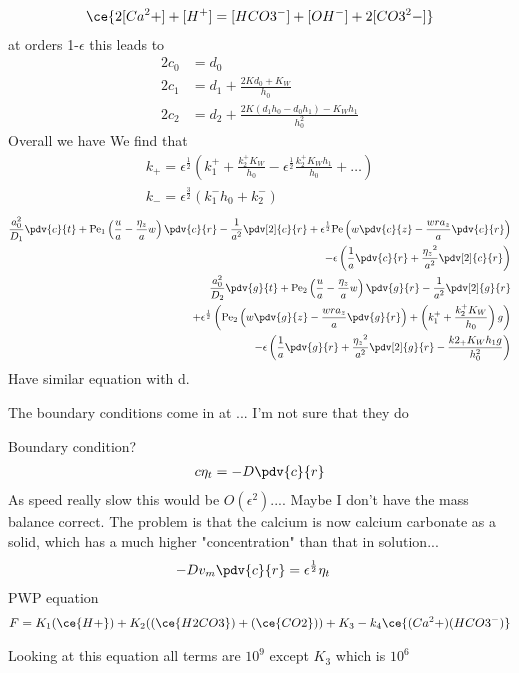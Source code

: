 \documentclass[12pt]{article}
\newcommand{\rt}{^{\frac{1}{2}}}
\newcommand{\rtt}{^{\frac{3}{2}}}
\newcommand{\Pe}{\mathrm{Pe}}
\begin{document}
\begin{align}
\ce{2[Ca^2+] + [H^+]=[HCO3^-] + [OH^-] + 2[CO3^2-]}
\end{align}
at orders 1-$\epsilon$ this leads to 
\begin{align}
2c_0 &= d_0\\
2c_1 & = d_1+\frac{2Kd_0+K_W}{h_0}\\
2c_2& = d_2+\frac{2K(d_1h_0-d_0h_1)-K_Wh_1}{h_0^2}
\end{align}
Overall we have 
We find that
\begin{align}
k_+ = \epsilon\rt\left(k_1^+ + \frac{k_2^+K_W}{h_0}-\epsilon\rt \frac{k_2^+K_Wh_1}{h_0}+\dots\right)\\
k_- = \epsilon\rtt\left(k_1^-h_0+k_2^-\right)
\end{align}
\begin{align}
\frac{a_0^2}{D_1}\pdv{c}{t}+\Pe_1\left(\frac{u}{a}-\frac{\eta_z}{a}w\right)\pdv{c}{r}-\frac{1}{a^2}\pdv[2]{c}{r}+\epsilon\rt\Pe\left(w\pdv{c}{z}-\frac{wra_z}{a}\pdv{c}{r}\right)\\-\epsilon\left(\frac{1}{a}\pdv{c}{r}+\frac{{\eta_z}^2}{a^2}\pdv[2]{c}{r}\right)\\
\frac{a_0^2}{D_2}\pdv{g}{t}+\Pe_2\left(\frac{u}{a}-\frac{\eta_z}{a}w\right)\pdv{g}{r}-\frac{1}{a^2}\pdv[2]{g}{r}\\
+\epsilon\rt\left(\Pe_2\left(w\pdv{g}{z}-\frac{wra_z}{a}\pdv{g}{r}\right)+\left(k_1^++\frac{k_2^+K_W}{h_0}\right)g\right)\\
-\epsilon\left(\frac{1}{a}\pdv{g}{r}+\frac{{\eta_z}^2}{a^2}\pdv[2]{g}{r}-\frac{k2_+K_Wh_1g}{h_0^2}\right)
\end{align}
Have similar equation with d.

The boundary conditions come in at ... I'm not sure that they do 

Boundary condition?
\begin{align}
c\eta_t = -D\pdv{c}{r}
\end{align}
As speed really slow this would be $O(\epsilon^2)$.... Maybe I don't have the mass balance correct. The problem is that the calcium is now calcium carbonate as a solid, which has a much higher "concentration" than that in solution...
\begin{align}
-Dv_m\pdv{c}{r} &= \epsilon\rt \eta_t
\end{align}
PWP equation
\begin{align}
F = K_1(\ce{H+})+K_2((\ce{H2CO3})+(\ce{CO2}))+K_3-k_4\ce{(Ca^2+)(HCO3^-)}
\end{align}

Looking at this equation all terms are $10^9$ except $K_3$ which is $10^6$
\end{document}
